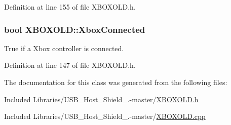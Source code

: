\-Definition at line 155 of file \-X\-B\-O\-X\-O\-L\-D.\-h.

\hypertarget{class_x_b_o_x_o_l_d_aa091ff52ba7ad4216b0cd0f18651b755}{
\subsubsection[{\-Xbox\-Connected}]{\setlength{\rightskip}{0pt plus 5cm}bool {\bf \-X\-B\-O\-X\-O\-L\-D\-::\-Xbox\-Connected}}}\label{class_x_b_o_x_o_l_d_aa091ff52ba7ad4216b0cd0f18651b755}
\-True if a \-Xbox controller is connected. 

\-Definition at line 147 of file \-X\-B\-O\-X\-O\-L\-D.\-h.



\-The documentation for this class was generated from the following files\-:\begin{DoxyCompactItemize}
\item 
\-Included Libraries/\-U\-S\-B\-\_\-\-Host\-\_\-\-Shield\-\_.-\/master/\hyperlink{_x_b_o_x_o_l_d_8h}{\-X\-B\-O\-X\-O\-L\-D.\-h}\item 
\-Included Libraries/\-U\-S\-B\-\_\-\-Host\-\_\-\-Shield\-\_.-\/master/\hyperlink{_x_b_o_x_o_l_d_8cpp}{\-X\-B\-O\-X\-O\-L\-D.\-cpp}\end{DoxyCompactItemize}
